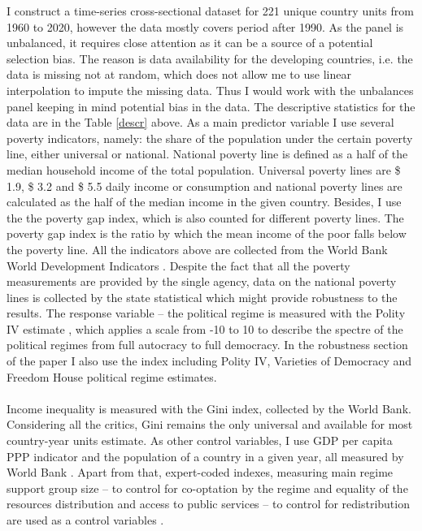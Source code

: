 \documentclass[a4paper, 12pt]{article}
\begin{document}
    \noindent I construct a time-series cross-sectional dataset for 221 unique country units from 1960 to 2020, however the data mostly covers period after 1990. As the panel is unbalanced, it requires close attention as it can be a source of a potential selection bias. The reason is data availability for the developing countries, i.e. the data is missing not at random, which does not allow me to use linear interpolation to impute the missing data. Thus I would work with the unbalances panel keeping in mind potential bias in the data. The descriptive statistics for the data are in the  Table \ref{descr} above.  As a main predictor variable I use several poverty indicators, namely: the share of the population under the certain poverty line, either universal or national. National poverty line is defined as a half of the median household income of the total population. Universal poverty lines are \$ 1.9, \$ 3.2 and \$ 5.5 daily income or consumption and national poverty lines are calculated as the half of the median income in the given country. Besides, I use the the poverty gap index, which is also counted for different poverty lines. The poverty gap index is the ratio by which the mean income of the poor falls below the poverty line. All the indicators above are collected from the World Bank World Development Indicators \parencite{worldbank}. Despite the fact that all the poverty measurements are provided by the single agency, data on the national poverty lines is collected by the state statistical which might provide robustness to the results. The response variable -- the political regime is measured with the Polity IV estimate \parencite{polity}, which applies a scale from -10 to 10 to describe the spectre of the political regimes from full autocracy to full democracy. In the robustness section of the paper I also use the index including Polity IV, Varieties of Democracy \parencite{VDemV10} and Freedom House \parencite{freedomhouse} political regime estimates. 
    \\\\
    Income inequality is measured with the Gini index, collected by the World Bank. Considering all the critics, Gini remains the only universal and available for most country-year units estimate. As other control variables, I use GDP per capita PPP indicator and the population of a country in a given year, all measured by World Bank \parencite{worldbank}. Apart from that,  expert-coded indexes, measuring main regime support group size -- to control for co-optation by the regime and equality of the resources distribution and access to public services -- to control for redistribution are used as a control variables \parencite{VDemV10}.
    
\end{document}
